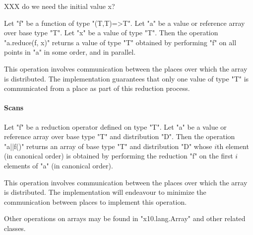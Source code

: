 XXX do we need the initial value x?

Let \xcd"f" be a function of type \xcd"(T,T)=>T".  Let
\xcd"a" be a value or reference array over base type \xcd"T".
Let \xcd"x" be a value of type \xcd"T".
Then the
operation \xcd"a.reduce(f, x)" returns a value of type \xcd"T" obtained
by performing \xcd"f" on all points in \xcd"a" in some order, and in
parallel.

This operation involves communication between the places over which
the array is distributed. The \Xten{} implementation guarantees that
only one value of type \xcd"T" is communicated from a place as part of
this reduction process.

\paragraph{Scans}\label{ArrayScans}

Let \xcd"f" be a reduction operator defined on type \xcd"T". Let
\xcd"a" be a value or reference array over base type \xcd"T" and
distribution \xcd"D". Then the operation \xcd"a||f()" returns an array
of base type \xcd"T" and distribution \xcd"D" whose $i$th element
(in canonical order) is obtained by performing the reduction \xcd"f"
on the first $i$ elements of \xcd"a" (in canonical order).

This operation involves communication between the places over which
the array is distributed. The \Xten{} implementation will endeavour to
minimize the communication between places to implement this operation.

Other operations on arrays may be found in \xcd"x10.lang.Array" and
other related classes.
